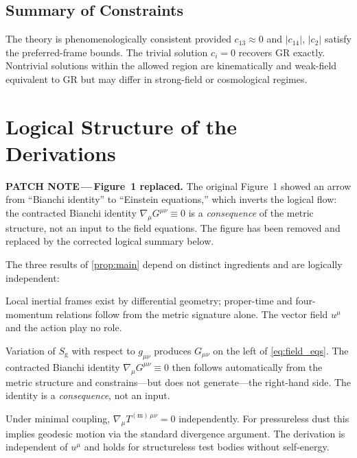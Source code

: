 \documentclass[12pt,a4paper]{article}
\newcommand{\patchnote}[1]{%
  \begin{patchbox}
    {\small\color{patchtext}\textbf{PATCH NOTE\,---\,}#1}
  \end{patchbox}}
\newcommand{\EH}{S_{\mathrm{g}}}
\begin{document}
\subsection{Summary of Constraints}

The theory is phenomenologically consistent provided $c_{13}\approx 0$ and
$|c_{14}|$, $|c_{2}|$ satisfy the preferred-frame bounds. The trivial solution
$c_{i}=0$ recovers GR exactly. Nontrivial solutions within the allowed region
are kinematically and weak-field equivalent to GR but may differ in strong-field
or cosmological regimes.

\section{Logical Structure of the Derivations}
\label{sec:logic}

\patchnote{\textbf{Figure~1 replaced.}
The original Figure~1 showed an arrow from ``Bianchi identity'' to ``Einstein
equations,'' which inverts the logical flow: the contracted Bianchi identity
$\nabla_{\!\mu}G^{\mu\nu}\equiv 0$ is a \emph{consequence} of the metric
structure, not an input to the field equations. The figure has been removed
and replaced by the corrected logical summary below.}

The three results of \cref{prop:main} depend on distinct ingredients and are
logically independent:

\begin{description}[leftmargin=2em, labelsep=1em]
  \item[SR kinematics $\Leftarrow$ Lorentzian signature.]
    Local inertial frames exist by differential geometry; proper-time and
    four-momentum relations follow from the metric signature alone. The vector
    field $u^{\mu}$ and the action play no role.

  \item[Einstein field equations $\Leftarrow$ EH action $+$ variational principle.]
    Variation of $\EH$ with respect to $g_{\mu\nu}$ produces $G_{\mu\nu}$ on
    the left of \cref{eq:field_eqs}. The contracted Bianchi identity
    $\nabla_{\!\mu}G^{\mu\nu}\equiv 0$ then follows automatically from the
    metric structure and constrains---but does not generate---the right-hand
    side. The identity is a \emph{consequence}, not an input.

  \item[WEP for test bodies $\Leftarrow$ minimal coupling $+$ Bianchi identity.]
    Under minimal coupling, $\nabla_{\!\mu}T^{(\mathrm{m})\,\mu\nu}=0$
    independently. For pressureless dust this implies geodesic motion via the
    standard divergence argument. The derivation is independent of $u^{\mu}$
    and holds for structureless test bodies without self-energy.
\end{description}
\end{document}
